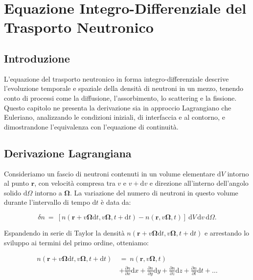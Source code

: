 \chapter{Equazione Integro-Differenziale del Trasporto Neutronico}

\section{Introduzione}
L'equazione del trasporto neutronico in forma integro-differenziale descrive l'evoluzione temporale e spaziale della densità di neutroni in un mezzo, tenendo conto di processi come la diffusione, l'assorbimento, lo scattering e la fissione. Questo capitolo ne presenta la derivazione sia in approccio Lagrangiano che Euleriano, analizzando le condizioni iniziali, di interfaccia e al contorno, e dimostrandone l’equivalenza con l’equazione di continuità.


\section{Derivazione Lagrangiana}
Consideriamo un fascio di neutroni contenuti in un volume elementare $\mathrm{d}V$ intorno al punto $\mathbf{r}$, con velocità compresa tra $v$ e $v + \mathrm{d}v$ e direzione all’interno dell’angolo solido $\mathrm{d}\Omega$ intorno a $\boldsymbol{\Omega}$. La variazione del numero di neutroni in questo volume durante l’intervallo di tempo $\mathrm{d}t$ è data da:

\begin{equation}
	\delta n\ =\ \left[ n (\mathbf{r} + v \boldsymbol{\Omega} \mathrm{d} t, v \boldsymbol{\Omega}, t + \mathrm{d} t) - n (\mathbf{r}, v \boldsymbol{\Omega}, t) \right] \ \mathrm{d} V\, \mathrm{d} v \,\mathrm{d} \Omega.
\end{equation}

Espandendo in serie di Taylor la densità $n(\mathbf{r} + v\boldsymbol{\Omega}\mathrm{d}t, v\boldsymbol{\Omega}, t + \mathrm{d}t)$ e arrestando lo sviluppo ai termini del primo ordine, otteniamo:

\begin{equation}
	\begin{aligned}
		n (\mathbf{r} + v \boldsymbol{\Omega} \mathrm{d} t, v \boldsymbol{\Omega}, t + \mathrm{d} t)\ &=\ n (\mathbf{r}, v \boldsymbol{\Omega}, t) \\
		&+ \frac{\partial n}{\partial x} \mathrm{d} x + \frac{\partial n}{\partial y} \mathrm{d} y + \frac{\partial n}{\partial z} \mathrm{d} z + \frac{\partial n}{\partial t} \mathrm{d} t + \dots
	\end{aligned}
\end{equation}

